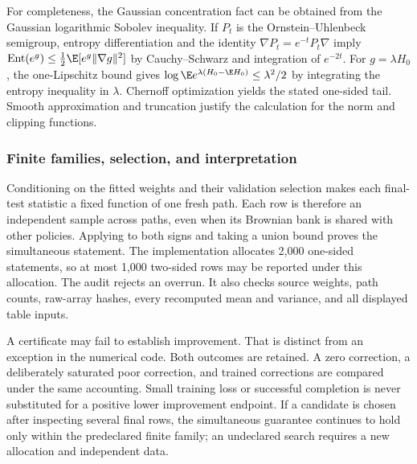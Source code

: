 For completeness, the Gaussian concentration fact can be obtained from the Gaussian logarithmic Sobolev inequality. If $P_t$ is the Ornstein--Uhlenbeck semigroup, entropy differentiation and the identity $\nabla P_t=e^{-t}P_t\nabla$ imply
$\operatorname{Ent}(e^g)\leq\tfrac12\E[e^g\|\nabla g\|^2]$ by Cauchy--Schwarz and integration of $e^{-2t}$. For $g=\lambda H_0$, the one-Lipschitz bound gives
$\log\E e^{\lambda(H_0-\E H_0)}\leq\lambda^2/2$ by integrating the entropy inequality in $\lambda$. Chernoff optimization yields the stated one-sided tail. Smooth approximation and truncation justify the calculation for the norm and clipping functions.

\subsubsection{Finite families, selection, and interpretation}
Conditioning on the fitted weights and their validation selection makes each final-test statistic a fixed function of one fresh path. Each row is therefore an independent sample across paths, even when its Brownian bank is shared with other policies. Applying \citet[Theorem~4]{maurer2009} to both signs and taking a union bound proves the simultaneous statement. The implementation allocates 2,000 one-sided statements, so at most 1,000 two-sided rows may be reported under this allocation. The audit rejects an overrun. It also checks source weights, path counts, raw-array hashes, every recomputed mean and variance, and all displayed table inputs.

A certificate may fail to establish improvement. That is distinct from an exception in the numerical code. Both outcomes are retained. A zero correction, a deliberately saturated poor correction, and trained corrections are compared under the same accounting. Small training loss or successful completion is never substituted for a positive lower improvement endpoint. If a candidate is chosen after inspecting several final rows, the simultaneous guarantee continues to hold only within the predeclared finite family; an undeclared search requires a new allocation and independent data.
